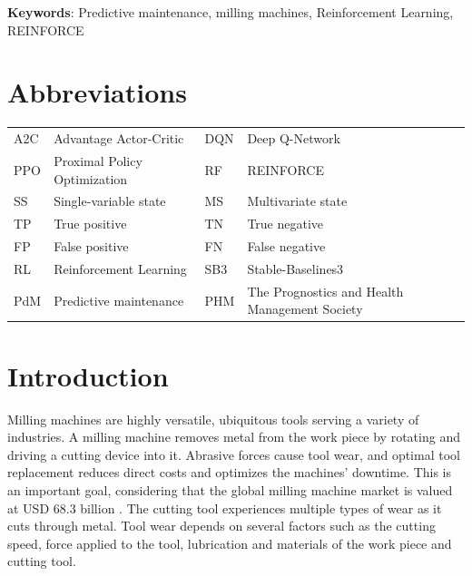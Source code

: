 \documentclass[a4paper, 12pt]{article}
\newcommand{\rowspace}[1]{\renewcommand{\arraystretch}{#1}}
\begin{document}
\noindent \textbf{Keywords}: Predictive maintenance, milling machines, Reinforcement Learning, REINFORCE
\section*{Abbreviations}

\begin{table}[!htbp]\centering
	\sffamily
	\rowspace{1.3}
	\begin{tabular}{L{1cm} L{4.5cm} L{1cm} L{4.5cm}}
		\toprule
		A2C & Advantage Actor-Critic & DQN & Deep Q-Network\\
		PPO & Proximal Policy Optimization & RF & REINFORCE\\
		SS  & Single-variable state & MS & Multivariate state\\
		TP  & True positive &TN &True negative\\
		FP  & False positive &FN &False negative\\
		RL  & Reinforcement Learning & SB3 & Stable-Baselines3\\
		PdM & Predictive maintenance & PHM & The Prognostics and Health Management Society\\

		\bottomrule
	\end{tabular}
	\label{tbl:abbrev}
\end{table}

\newpage
\thispagestyle{empty}
\section{Introduction}


Milling machines are highly versatile, ubiquitous tools serving a variety of industries. A milling machine removes metal from the work piece by rotating and driving a cutting device into it. Abrasive forces cause tool wear, and optimal tool replacement reduces direct costs and optimizes the machines' downtime. This is an important goal, considering that the global milling machine market is valued at USD 68.3 billion \citep{milling-market}. The cutting tool experiences multiple types of wear as it cuts through metal. Tool wear depends on several factors such as the cutting speed, force applied to the tool, lubrication and materials of the work piece and cutting tool. 
\end{document}
